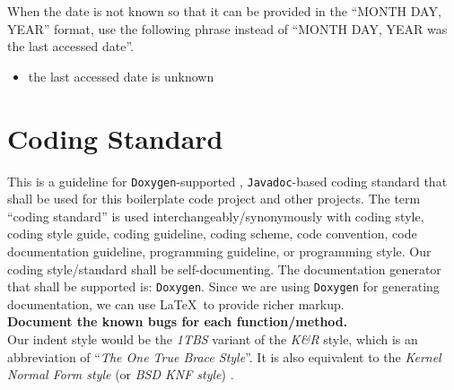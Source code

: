 \documentclass[letter,12pt]{article}
\begin{document}
When the date is not known so that it can be provided in the ``MONTH DAY, YEAR'' format, use the following phrase instead of ``MONTH DAY, YEAR was the last accessed date''. \vspace{-0.3cm}
\begin{itemize} \itemsep -4pt
\item the last accessed date is unknown
\end{itemize}














\section{Coding Standard}
\label{sec:CodingStandard}

This is a guideline for {\tt Doxygen}-supported \cite{vanHeesch2016}, {\tt Javadoc}-based \cite{Long1995} coding standard that shall be used for this boilerplate code project and other projects. The term ``coding standard'' is used interchangeably/synonymously with coding style, coding style guide, coding guideline, coding scheme, code convention, code documentation guideline, programming guideline, or programming style. Our coding style/standard shall be self-documenting. The documentation generator that shall be supported is: {\tt Doxygen}. Since we are using {\tt Doxygen} for generating documentation, we can use \LaTeX\ to provide richer markup. \\

{\bf Document the known bugs for each function/method.} \\

Our indent style would be the {\it 1TBS} variant of the {\it K{\rm \&}R} style, which is an abbreviation of ``{\it The One True Brace Style}''. It is also equivalent to the {\it Kernel Normal Form style} (or {\it BSD KNF style}) \cite{WikipediaContributors2016j}. \\
\end{document}
